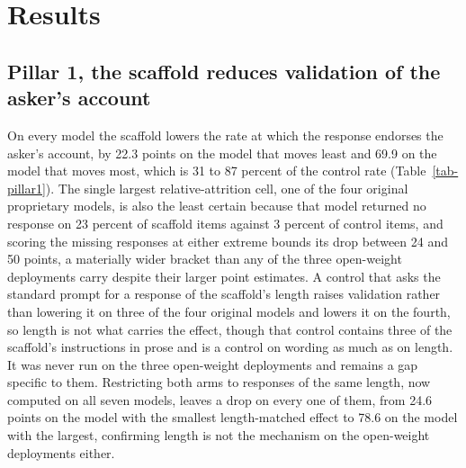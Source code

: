 \providecommand{\todo}[1]{\textbf{[TODO: #1]}}

\section{Results}
\label{sec-results-unified}

\subsection{Pillar 1, the scaffold reduces validation of the asker's account}
\label{sec-results-pillar1}

\begin{table}[t]
\centering
\small

\caption{Validation of the asker's account on 150 open-ended dilemmas, scored
from the complete response. Drop is the scaffold minus the control in
points with an item-clustered 95 percent interval. Relative is the drop
over the control rate. Bracket bounds the drop over responses an arm did
not return. Length-matched restricts both arms to responses of the same
length where the arms share support, with the number of responses used.}
\label{tab-pillar1}
\end{table}

On every model the scaffold lowers the rate at which the response endorses
the asker's account, by 22.3 points on the model that moves least and 69.9
on the model that moves most,
which is 31 to 87 percent of the control rate
(Table~\ref{tab-pillar1}). The single largest relative-attrition cell,
one of the four original proprietary models, is also the least certain
because that model returned no response on 23 percent of scaffold items
against 3 percent of control items,
and scoring the missing responses at either extreme bounds its drop
between 24 and 50 points, a materially wider bracket than any of the
three open-weight deployments carry despite their larger point estimates.
A control that asks the standard prompt for a response of the scaffold's
length raises validation rather than lowering it on three of the four
original models
and lowers it on the fourth,
so length is not what carries the effect, though that control contains
three of the scaffold's instructions in prose and is a control on wording
as much as on length. It was never run on the three open-weight
deployments and remains a gap specific to them.
Restricting both arms to responses of the same length, now computed on
all seven models, leaves a drop on every one of them, from 24.6 points
on the model with the smallest length-matched effect to 78.6 on the
model with the largest, confirming length is not the mechanism on the
open-weight deployments either.

